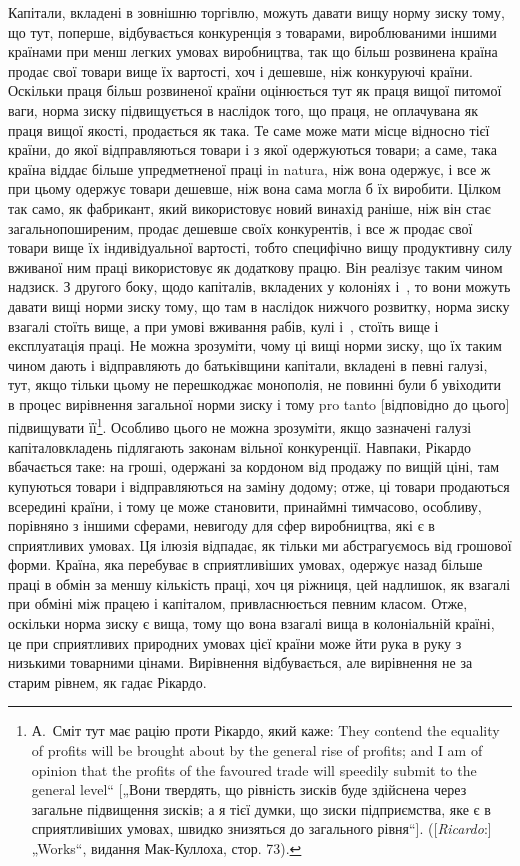 Капітали, вкладені в зовнішню торгівлю, можуть давати вищу норму зиску тому, що тут, поперше,
відбувається конкуренція з товарами, вироблюваними іншими країнами при менш легких умовах
виробництва, так що більш розвинена країна продає свої
товари вище їх вартості, хоч і дешевше, ніж конкуруючі країни. Оскільки праця більш розвиненої
країни оцінюється тут як праця вищої питомої ваги, норма зиску підвищується в наслідок того, що
праця, не оплачувана як праця вищої якості, продається як така. Те саме може мати місце відносно
тієї країни, до якої відправляються товари і з якої одержуються товари; а саме, така країна віддає
більше упредметненої праці in natura, ніж вона одержує, і все ж при цьому одержує товари дешевше,
ніж вона сама могла б їх виробити. Цілком так само, як фабрикант,
який використовує новий винахід раніше, ніж він стає загальнопоширеним, продає дешевше своїх
конкурентів, і все ж продає свої товари вище їх індивідуальної вартості, тобто специфічно вищу
продуктивну силу вживаної ним праці використовує як додаткову працю. Він реалізує таким чином
надзиск. З другого боку, щодо капіталів, вкладених у колоніях і~, то вони можуть давати вищі
норми зиску тому, що там в наслідок нижчого розвитку, норма зиску взагалі стоїть вище, а при умові
вживання рабів, кулі і~, стоїть вище і експлуатація праці. Не можна зрозуміти, чому ці вищі
норми зиску, що їх таким чином дають і відправляють до батьківщини капітали, вкладені в певні
галузі, тут, якщо тільки цьому не перешкоджає монополія, не повинні були б увіходити в процес
вирівнення загальної норми зиску і тому pro tanto [відповідно до цього] підвищувати її\footnote{
А.~Сміт тут має рацію проти Рікардо, який каже: They contend the equality of profits will be
brought about by the general rise of profits; and I am of opinion that the profits of the favoured
trade will speedily submit to the general level“ [„Вони твердять, що рівність зисків буде здійснена
через загальне підвищення зисків; а я тієї думки, що зиски підприємства, яке є в сприятливіших
умовах, швидко знизяться до загального рівня“]. ([\emph{Ricardo}:] „Works“, видання Мак-Куллоха, стор. 73).
}. Особливо
цього не можна зрозуміти, якщо зазначені
галузі капіталовкладень підлягають законам вільної конкуренції. Навпаки, Рікардо вбачається
таке: на гроші, одержані за кордоном від продажу по вищій ціні, там купуються товари і
відправляються на заміну додому; отже, ці товари продаються
всередині країни, і тому це може становити, принаймні тимчасово, особливу, порівняно з іншими
сферами, невигоду для сфер виробництва, які є в сприятливих умовах. Ця ілюзія відпадає, як тільки ми
абстрагуємось від грошової форми. Країна,
яка перебуває в сприятливіших умовах, одержує назад більше праці в обмін за меншу кількість праці,
хоч ця ріжниця, цей надлишок, як взагалі при обміні між працею і капіталом, привласнюється певним
класом. Отже, оскільки норма зиску є вища, тому
що вона взагалі вища в колоніальній країні, це при сприятливих природних умовах цієї країни може йти
рука в руку з низькими товарними цінами. Вирівнення відбувається, але вирівнення не за старим
рівнем, як гадає Рікардо.

